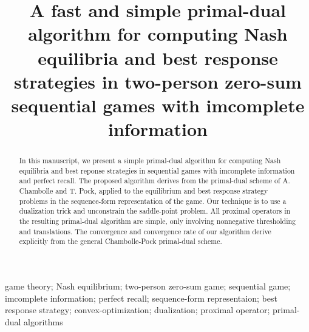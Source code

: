 \documentclass[a4paper,9pt,journal]{IEEEtran}
\begin{document}
\onecolumn
\title{A fast and simple primal-dual algorithm for computing Nash equilibria and best response strategies
  in two-person zero-sum sequential games with imcomplete information}


\author{}


\maketitle

\begin{abstract}
% 
In this manuscript, we present a simple primal-dual algorithm for computing Nash equilibria and best reponse strategies in  sequential games with
imcomplete information and perfect recall. The proposed algorithm derives from the primal-dual scheme of A. Chambolle and T. Pock, applied to the
equilibrium and best response strategy problems in the sequence-form representation of the game. Our technique is to use a dualization
trick and unconstrain the saddle-point problem. All proximal operators in the resulting primal-dual algorithm are simple,
only involving nonnegative thresholding and translations.
The convergence and convergence rate of our algorithm derive explicitly from the general Chambolle-Pock primal-dual scheme.

\end{abstract}


\begin{IEEEkeywords}
  game theory; Nash equilibrium; two-person zero-sum game; sequential game; imcomplete information; perfect recall; sequence-form representaion;
  best response strategy; convex-optimization; dualization; proximal operator; primal-dual algorithms
\end{IEEEkeywords}
\end{document}
